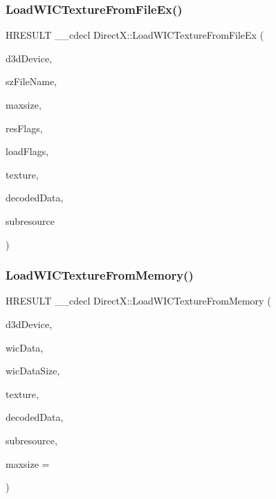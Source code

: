 \subsubsection{\texorpdfstring{Load\+W\+I\+C\+Texture\+From\+File\+Ex()}{LoadWICTextureFromFileEx()}}
{\footnotesize\ttfamily H\+R\+E\+S\+U\+LT \+\_\+\+\_\+cdecl Direct\+X\+::\+Load\+W\+I\+C\+Texture\+From\+File\+Ex (\begin{DoxyParamCaption}\item[{\+\_\+\+In\+\_\+ I\+D3\+D12\+Device $\ast$}]{d3d\+Device,  }\item[{\+\_\+\+In\+\_\+z\+\_\+ const wchar\+\_\+t $\ast$}]{sz\+File\+Name,  }\item[{size\+\_\+t}]{maxsize,  }\item[{D3\+D12\+\_\+\+R\+E\+S\+O\+U\+R\+C\+E\+\_\+\+F\+L\+A\+GS}]{res\+Flags,  }\item[{unsigned int}]{load\+Flags,  }\item[{\+\_\+\+Outptr\+\_\+ I\+D3\+D12\+Resource $\ast$$\ast$}]{texture,  }\item[{std\+::unique\+\_\+ptr$<$ uint8\+\_\+t\mbox{[}$\,$\mbox{]}$>$ \&}]{decoded\+Data,  }\item[{D3\+D12\+\_\+\+S\+U\+B\+R\+E\+S\+O\+U\+R\+C\+E\+\_\+\+D\+A\+TA \&}]{subresource }\end{DoxyParamCaption})}

\mbox{\label{namespace_direct_x_a8f576b66bd7c5e3642f7b9dac0755504}} 
\subsubsection{\texorpdfstring{Load\+W\+I\+C\+Texture\+From\+Memory()}{LoadWICTextureFromMemory()}}
{\footnotesize\ttfamily H\+R\+E\+S\+U\+LT \+\_\+\+\_\+cdecl Direct\+X\+::\+Load\+W\+I\+C\+Texture\+From\+Memory (\begin{DoxyParamCaption}\item[{\+\_\+\+In\+\_\+ I\+D3\+D12\+Device $\ast$}]{d3d\+Device,  }\item[{\+\_\+\+In\+\_\+reads\+\_\+bytes\+\_\+(wic\+Data\+Size) const uint8\+\_\+t $\ast$}]{wic\+Data,  }\item[{size\+\_\+t}]{wic\+Data\+Size,  }\item[{\+\_\+\+Outptr\+\_\+ I\+D3\+D12\+Resource $\ast$$\ast$}]{texture,  }\item[{std\+::unique\+\_\+ptr$<$ uint8\+\_\+t\mbox{[}$\,$\mbox{]}$>$ \&}]{decoded\+Data,  }\item[{D3\+D12\+\_\+\+S\+U\+B\+R\+E\+S\+O\+U\+R\+C\+E\+\_\+\+D\+A\+TA \&}]{subresource,  }\item[{size\+\_\+t}]{maxsize = {} }\end{DoxyParamCaption})}

